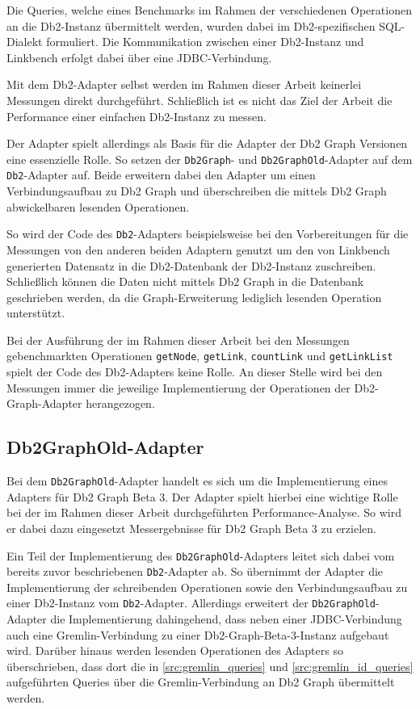 Die Queries, welche eines Benchmarks im Rahmen der verschiedenen Operationen an die Db2-Instanz übermittelt werden, wurden dabei im Db2-spezifischen SQL-Dialekt formuliert. Die Kommunikation zwischen einer Db2-Instanz und Linkbench erfolgt dabei über eine JDBC-Verbindung. 

Mit dem Db2-Adapter selbst werden im Rahmen dieser Arbeit keinerlei Messungen direkt durchgeführt. Schließlich ist es nicht das Ziel der Arbeit die Performance einer einfachen Db2-Instanz zu messen. 

Der Adapter spielt allerdings als Basis für die Adapter der Db2 Graph Versionen eine essenzielle Rolle. So setzen der \texttt{Db2Graph}- und \texttt{Db2GraphOld}-Adapter auf dem \texttt{Db2}-Adapter auf. Beide erweitern dabei den Adapter um einen Verbindungsaufbau zu Db2 Graph und überschreiben die mittels Db2 Graph abwickelbaren lesenden Operationen.

So wird der Code des \texttt{Db2}-Adapters beispielsweise bei den Vorbereitungen für die Messungen von den anderen beiden Adaptern genutzt um den von Linkbench generierten Datensatz in die Db2-Datenbank der Db2-Instanz zuschreiben. Schließlich können die Daten nicht mittels Db2 Graph in die Datenbank geschrieben werden, da die Graph-Erweiterung lediglich lesenden Operation unterstützt.

Bei der Ausführung der im Rahmen dieser Arbeit bei den Messungen gebenchmarkten Operationen \texttt{getNode}, \texttt{getLink}, \texttt{countLink} und \texttt{getLinkList} spielt der Code des Db2-Adapters keine Rolle. An dieser Stelle wird bei den Messungen immer die jeweilige Implementierung der Operationen der Db2-Graph-Adapter herangezogen.

\subsection{Db2GraphOld-Adapter}
Bei dem \texttt{Db2GraphOld}-Adapter handelt es sich um die Implementierung eines Adapters für Db2 Graph Beta 3. Der Adapter spielt hierbei eine wichtige Rolle bei der im Rahmen dieser Arbeit durchgeführten Performance-Analyse. So wird er dabei dazu eingesetzt Messergebnisse für Db2 Graph Beta 3 zu erzielen. 

Ein Teil der Implementierung des \texttt{Db2GraphOld}-Adapters leitet sich dabei vom bereits zuvor beschriebenen \texttt{Db2}-Adapter ab. So übernimmt der Adapter die Implementierung der schreibenden Operationen sowie den Verbindungsaufbau zu einer Db2-Instanz vom \texttt{Db2}-Adapter. Allerdings erweitert der \texttt{Db2GraphOld}-Adapter die Implementierung dahingehend, dass neben einer JDBC-Verbindung auch eine Gremlin-Verbindung zu einer Db2-Graph-Beta-3-Instanz aufgebaut wird. Darüber hinaus werden lesenden Operationen des Adapters so überschrieben, dass dort die in \autoref{src:gremlin_queries} und \autoref{src:gremlin_id_queries} aufgeführten Queries über die Gremlin-Verbindung an Db2 Graph übermittelt werden. 


